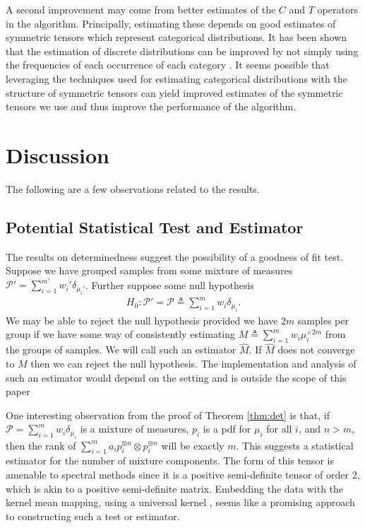 \documentclass[aos,preprint]{imsart}
\def\sP{\mathscr{P}}
\theoremstyle{plain}
\theoremstyle{defintion}
\begin{document}
	A second improvement may come from better estimates of the $C$ and $T$ operators in the algorithm. Principally, estimating these depends on good estimates of symmetric tensors which represent categorical distributions. It has been shown that the estimation of discrete distributions can be improved by not simply using the frequencies of each occurrence of each category \cite{lehmann03,valiant16,orlitsky15,kamath15,han15,paninski05}. It seems possible that leveraging the techniques used for estimating categorical distributions with the structure of symmetric tensors can yield improved estimates of the symmetric tensors we use and thus improve the performance of the algorithm.

	\section{Discussion}
	The following are a few observations related to the results.
	\subsection{Potential Statistical Test and Estimator}
	The results on determinedness suggest the possibility of a goodness of fit test. Suppose we have grouped samples from some mixture of measures $\sP' = \sum_{i=1}^{m'} w_i' \delta_{\mu_i'}$. Further suppose some null hypothesis 
	\begin{align*}
            H_0: \sP' = \sP \triangleq \sum_{i=1}^m w_i \delta_{\mu_i}.
	\end{align*}
	We may be able to reject the null hypothesis provided we have $2m$ samples per group if we have some way of consistently estimating $M \triangleq \sum_{i=1}^m w_i \mu_i^{\times 2m}$ from the groups of samples. We will call such an estimator $\widehat{M}$. If $\widehat{M}$ does not converge to $M$ then we can reject the null hypothesis. The implementation and analysis of such an estimator would depend on the setting and is outside the scope of this paper

	One interesting observation from the proof of Theorem \ref{thm:det} is that, if $\sP= \sum_{i=1}^{m}  w_i \delta_{\mu_i}$ is a mixture of measures, $p_i$ is a pdf for $\mu_i$ for all $i$, and $n>m$, then the rank of $\sum_{i=1}^m a_i p_i^{\otimes n} \otimes p_i^{\otimes n}$ will be exactly $m$. This suggests a statistical estimator for the number of mixture components. The form of this tensor is amenable to spectral methods since it is a positive semi-definite tensor of order 2, which is akin to a positive semi-definite matrix. Embedding the data with the kernel mean mapping, using a universal kernel \cite{micchelli06}, seems like a promising approach to constructing such a test or estimator.
\end{document}
